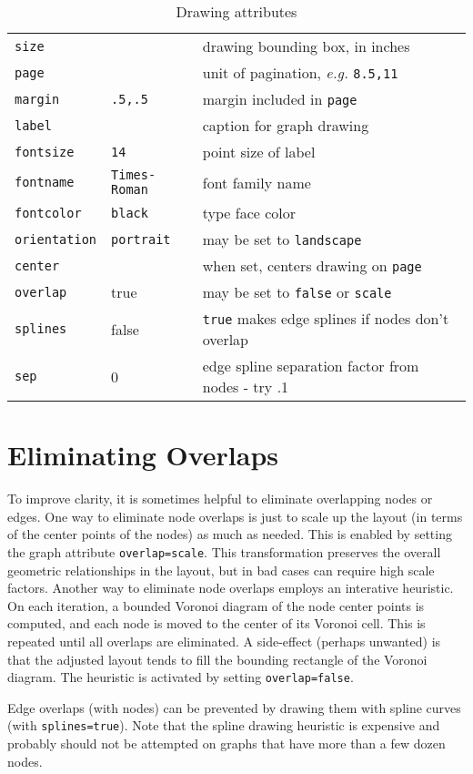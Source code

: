 \documentclass[11pt]{article}
\begin{document}
\begin{table}
\begin{tabular}[t]{|l|l|p{3.5in}|}
{\tt size} & & drawing bounding box, in inches \\
{\tt page} & & unit of pagination, {\it e.g.} {\tt 8.5,11} \\
{\tt margin} & {\tt .5,.5} & margin included in {\tt page} \\
{\tt label} & & caption for graph drawing \\
{\tt fontsize} & {\tt 14} & point size of label \\
{\tt fontname} & {\tt Times-Roman} & font family name \\
{\tt fontcolor} & {\tt black} & type face color \\ 
{\tt orientation} & {\tt portrait} & may be set to {\tt landscape} \\ 
{\tt center} & & when set, centers drawing on {\tt page} \\ \hline
{\tt overlap} & true & may be set to {\tt false} or {\tt scale} \\ \hline
{\tt splines} & false & {\tt true} makes edge splines if nodes don't overlap \\ \hline
{\tt sep} & 0 & edge spline separation factor from nodes - try .1 \\ \hline
\end{tabular}
\caption{Drawing attributes}
\label{table:attrs}
\end{table}

\section{Eliminating Overlaps}
To improve clarity, it is sometimes helpful to eliminate 
overlapping nodes or edges. One way to eliminate node overlaps
is just to scale up the layout (in terms of the center points
of the nodes) as much as needed.  This is enabled by setting
the graph attribute {\tt overlap=scale}.  This transformation
preserves the overall geometric relationships in the layout,
but in bad cases can require high scale factors.  Another way
to eliminate node overlaps employs an interative heuristic.
On each iteration, a bounded Voronoi diagram of the node center points
is computed, and each node is moved to the center of its Voronoi cell.
This is repeated until all overlaps are eliminated.  A side-effect
(perhaps unwanted) is that the adjusted layout tends to fill the
bounding rectangle of the Voronoi diagram.  The heuristic is activated
by setting {\tt overlap=false}.

Edge overlaps (with nodes) can be prevented by drawing them
with spline curves (with {\tt splines=true}). Note that the spline
drawing heuristic is expensive and probably should not be attempted
on graphs that have more than a few dozen nodes.
\end{document}
